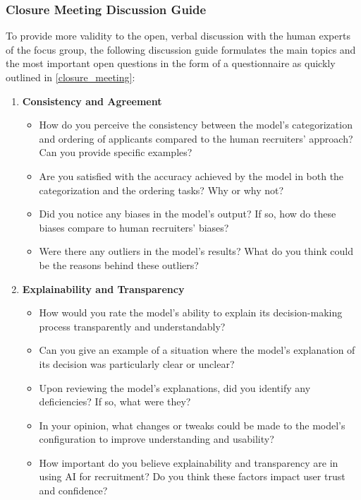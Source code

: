\documentclass[draft,final]{thesisclass} %
\begin{document}
\subsubsection{Closure Meeting Discussion Guide}
To provide more validity to the open, verbal discussion with the human experts of the focus group, the following discussion guide formulates the main topics and the most important open questions in the form of a questionnaire as quickly outlined in \ref{closure_meeting}:
\begin{enumerate}
    \item \textbf{Consistency and Agreement}
    \begin{itemize}
        \item How do you perceive the consistency between the model's categorization and ordering of applicants compared to the human recruiters' approach? Can you provide specific examples?
        \item Are you satisfied with the accuracy achieved by the model in both the categorization and the ordering tasks? Why or why not?
        \item Did you notice any biases in the model's output? If so, how do these biases compare to human recruiters' biases?
        \item Were there any outliers in the model's results? What do you think could be the reasons behind these outliers?
    \end{itemize}
    \item \textbf{Explainability and Transparency}
    \begin{itemize}
        \item How would you rate the model's ability to explain its decision-making process transparently and understandably?
        \item Can you give an example of a situation where the model's explanation of its decision was particularly clear or unclear?
        \item Upon reviewing the model's explanations, did you identify any deficiencies? If so, what were they?
        \item In your opinion, what changes or tweaks could be made to the model's configuration to improve understanding and usability?
        \item How important do you believe explainability and transparency are in using \acs{AI} for recruitment? Do you think these factors impact user trust and confidence?
    \end{itemize}
\end{enumerate}
\end{document}
